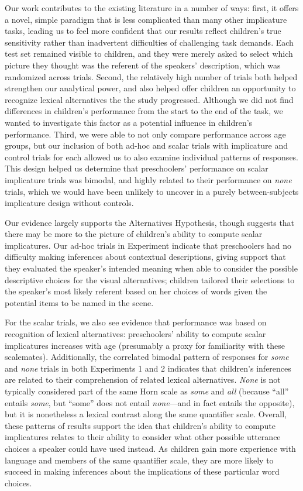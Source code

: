 \documentclass[10pt,letterpaper]{article}
\begin{document}
Our work contributes to the existing literature in a number of ways: first, it offers a novel, simple paradigm that is less complicated than many other implicature tasks, leading us to feel more confident that our results reflect children's true sensitivity rather than inadvertent difficulties of challenging task demands. Each test set remained visible to children, and they were merely asked to select which picture they thought was the referent of the speakers' description, which was randomized across trials. Second, the relatively high number of trials both helped strengthen our analytical power, and also helped offer children an opportunity to recognize lexical alternatives the the study progressed. Although we did not find differences in children's performance from the start to the end of the task, we wanted to investigate this factor as a potential influence in children's performance. Third, we were able to not only compare performance across age groups, but our inclusion of both ad-hoc and scalar trials with implicature and control trials for each allowed us to also examine individual patterns of responses. This design helped us determine that preschoolers' performance on scalar implicature trials was bimodal, and highly related to their performance on \emph{none} trials, which we would have been unlikely to uncover in a purely between-subjects implicature design without controls. 

Our evidence largely supports the Alternatives Hypothesis, though suggests that there may be more to the picture of children's ability to compute scalar implicatures. Our ad-hoc trials in Experiment indicate that preschoolers had no difficulty making inferences about contextual descriptions, giving support that they evaluated the speaker's intended meaning when able to consider the possible descriptive choices for the visual alternatives; children tailored their selections to the speaker's most likely referent based on her choices of words given the potential items to be named in the scene. 

For the scalar trials, we also see evidence that performance was based on recognition of lexical alternatives: preschoolers' ability to compute scalar implicatures increases with age (presumably a proxy for familiarity with these scalemates). Additionally, the correlated bimodal pattern of responses for \emph{some} and \emph{none} trials in both Experiments 1 and 2 indicates that children's inferences are related to their comprehension of related lexical alternatives. \emph{None} is not typically considered part of the same Horn scale as \emph{some} and \emph{all} (because ``all'' entails \emph{some}, but ``some'' does not entail \emph{none}---and in fact entails the opposite), but it is nonetheless a lexical contrast along the same quantifier scale. Overall, these patterns of results support the idea that children's ability to compute implicatures relates to their ability to consider what other possible utterance choices a speaker could have used instead.  As children gain more experience with language and members of the same quantifier scale, they are more likely to succeed in making inferences about the implications of these particular word choices. 
\end{document}
